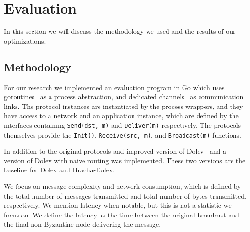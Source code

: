 \section{Evaluation}
\label{eval}



In this section we will discuss the methodology we used and the results of our optimizations.

\subsection{Methodology}
For our research we implemented an evaluation program in Go which uses goroutines~\cite{goroutines} as a process abstraction, and dedicated channels~\cite{channels} as communication links. The protocol instances are instantiated by the process wrappers, and they have access to a network and an application instance, which are defined by the interfaces containing \texttt{Send(dst, m)} and \texttt{Deliver(m)} respectively. The protocols themselves provide the \texttt{Init()}, \texttt{Receive(src, m)}, and \texttt{Broadcast(m)} functions.

In addition to the original protocols and improved version of Dolev~\cite{bonomi2019multihop} and a version of Dolev with naive routing was implemented. These two versions are the baseline for Dolev and Bracha-Dolev. 

We focus on message complexity and network consumption, which is defined by the total number of messages transmitted and total number of bytes transmitted, respectively. We mention latency when notable, but this is not a statistic we focus on. We define the latency as the time between the original broadcast and the final non-Byzantine node delivering the message. 

